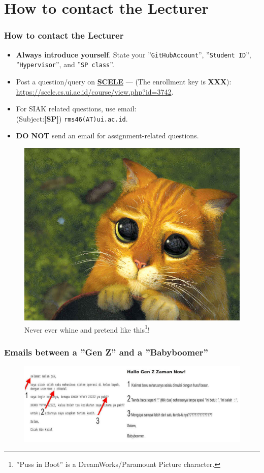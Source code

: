 \documentclass[aspectratio=169, xcolor=table, notheorems, hyperref={pdfpagelabels=false}]{beamer}
\begin{document}
\section{How to contact the Lecturer}
\begin{frame}[fragile]
\frametitle{How to contact the Lecturer}
\begin{itemize}
\item \textbf{Always introduce yourself}. State your ''\texttt{GitHubAccount}'', 
      ''\texttt{Student ID}'', ''\texttt{Hypervisor}'', and ''\texttt{SP class}''.
\item Post a question/query on
\href{https://scele.cs.ui.ac.id/course/view.php?id=3742}{\textbf{SCELE}} ---
(The enrollment key is \textbf{XXX}):
\url{https://scele.cs.ui.ac.id/course/view.php?id=3742}.
\item For SIAK related questions, use email:\\
(Subject:\textbf{[SP]}) \texttt{rms46(AT)ui.ac.id}.
\item \textbf{DO NOT} send an email for assignment-related questions.
\end{itemize}

\begin{figure}
\includegraphics[width=0.20\linewidth]{os00-pib}
\caption{Never ever whine and pretend like
         this\footnote{''Puss in Boot'' is a DreamWorks/Paramount Picture character.}!}
\end{figure}
\end{frame}

\begin{frame}
\frametitle{Emails between a ''Gen Z'' and a ''Babyboomer''}
\begin{figure}
\includegraphics[width=1.01\linewidth]{os-millenial-mail}
\end{figure}
\end{frame}
\end{document}
